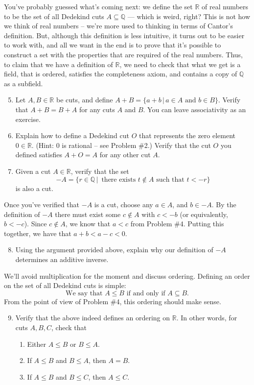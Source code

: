 \documentclass[letterpaper,12pt]{article}
\newcommand{\R}{\mathbb{R}}
\newcommand{\Q}{\mathbb{Q}}
\begin{document}
You've probably guessed what's coming next: we define the set $\R$ of real numbers to be the set of all Dedekind cuts $A\subseteq \Q$ --- which is weird, right? This is not how we think of real numbers -- we're more used to thinking in terms of Cantor's definition. But, although this definition is less intuitive, it turns out to be easier to work with, and all we want in the end is to prove that it's possible to construct a set with the properties that are required of the real numbers. Thus, to claim that we have a definition of $\R$, we need to check that what we get is a field, that is ordered, satisfies the completeness axiom, and contains a copy of $\Q$ as a subfield.
\begin{enumerate}
\setcounter{enumi}{4}
\item Let $A,B\in \R$ be cuts, and define $A+B = \{a+b\,|\, a\in A \text{ and } b\in B\}$. Verify that $A+B=B+A$ for any cuts $A$ and $B$. You can leave associativity as an exercise.
\item Explain how to define a Dedekind cut $O$ that represents the zero element $0\in\R$. (Hint: 0 is rational -- see Problem \#2.) Verify that the cut $O$ you defined satisfies $A+O=A$ for any other cut $A$.
\item Given a cut $A\in\R$, verify that the set 
\[
-A = \{r\in \Q\,|\, \text{ there exists } t\notin A \text{ such that } t<-r\}
\]
is also a cut.
\end{enumerate}
Once you've verified that $-A$ is a cut, choose any $a\in A$, and $b\in -A$. By the definition of $-A$ there must exist some $c\notin A$ with $c<-b$ (or equivalently, $b<-c$). Since $c\notin A$, we know that $a<c$ from Problem \#4. Putting this together, we have that $a+b < a-c < 0$.
\begin{enumerate}
\setcounter{enumi}{7}
\item Using the argument provided above, explain why our definition of $-A$ determines an additive inverse.
\end{enumerate}
We'll avoid multiplication for the moment and discuss ordering. Defining an order on the set of all Dedekind cuts is simple:
\[
 \text{We say that } A\leq B \text{ if and only if } A\subseteq B.
\]
From the point of view of Problem \#4, this ordering should make sense. 
\begin{enumerate}
\setcounter{enumi}{8}
\item Verify that the above indeed defines an ordering on $\R$. In other words, for cuts $A, B, C$, check that
\begin{enumerate}
 \item Either $A\leq B$ or $B\leq A$.
 \item If $A\leq B$ and $B\leq A$, then $A=B$.
 \item If $A\leq B$ and $B\leq C$, then $A\leq C$.
\end{enumerate}
\end{enumerate}
\end{document}
